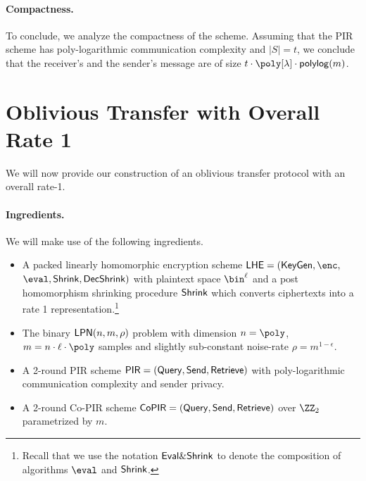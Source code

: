 \paragraph{Compactness.} To conclude, we analyze the compactness of the scheme. Assuming that the PIR scheme has poly-logarithmic communication complexity and $|S|=t$, we conclude that the receiver's and the sender's message are of size $t\cdot\poly[\lambda]\cdot\mathsf{polylog}(m)$.

\section{Oblivious Transfer with Overall Rate 1}
\label{sec:rate1OTwithCoPIR}

We will now provide our construction of an oblivious transfer protocol with an overall rate-1.

\paragraph{Ingredients.} We will make use of the following ingredients.
\begin{itemize}
    \item A packed linearly homomorphic encryption scheme $\LHE = (\keygen,\enc,$ $\eval,\shrink,\decshrink)$ with plaintext space $\bin^\ell$ and a post homomorphism shrinking procedure $\mathsf{Shrink}$ which converts ciphertexts into a rate 1 representation.\footnote{Recall that we use the notation $\mathsf{Eval\& Shrink}$ to denote the composition of algorithms $\eval$ and $\mathsf{Shrink}$.}
    
    
    \item The binary $\mathsf{LPN}(n,m,\rho)$ problem with dimension $n = \poly$, $m = n \cdot \ell \cdot \poly$ samples and slightly sub-constant noise-rate $\rho = m^{1 - \epsilon}$.
    \item A 2-round PIR scheme $\mathsf{PIR} = (\mathsf{Query},\mathsf{Send},\mathsf{Retrieve})$ with poly-logarithmic communication complexity and sender privacy.
    \item A 2-round Co-PIR scheme $\mathsf{CoPIR}=(\mathsf{Query},\mathsf{Send},\mathsf{Retrieve})$ over $\ZZ_2$ parametrized by $m$.
\end{itemize}

